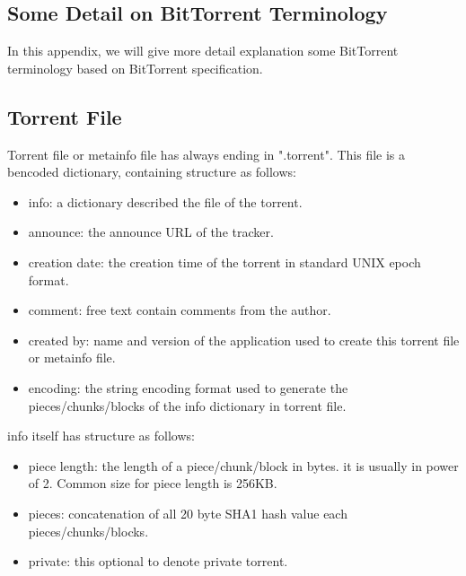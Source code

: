 \begin{appendices}

\chapter{Some Detail on BitTorrent Terminology}

In this appendix, we will give more detail explanation some BitTorrent terminology based on BitTorrent specification. 

\section{Torrent File}
Torrent file or metainfo file has always ending in ".torrent".  
This file is a bencoded dictionary, containing structure as follows:
\begin{itemize}
	\item info: a dictionary described the file of the torrent. 
	\item announce: the announce URL of the tracker.
	\item creation date: the creation time of the torrent in standard UNIX epoch format. 
	\item comment: free text contain comments from the author.
	\item created by: name and version of the application used to create this torrent file or metainfo file.
	\item encoding: the string encoding format used to generate the pieces/chunks/blocks of the info dictionary in torrent file.
\end{itemize}
info itself has structure as follows:
\begin{itemize}
	\item piece length: the length of a piece/chunk/block in bytes. it is usually in power of 2. Common size for piece length is 256KB.
	\item pieces: concatenation of all 20 byte SHA1 hash value each pieces/chunks/blocks.
	\item private: this optional to denote private torrent.
\end{itemize}


\end{appendices}

